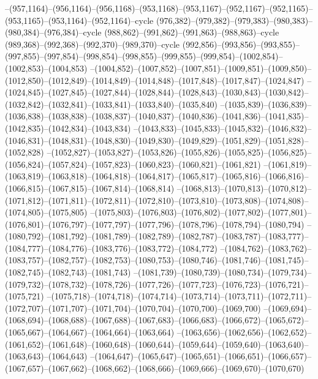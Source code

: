 --(957,1164)--(956,1164)--(956,1168)--(953,1168)--(953,1167)--(952,1167)--(952,1165)--(953,1165)--(953,1164)--(952,1164)--cycle
(976,382)--(979,382)--(979,383)--(980,383)--(980,384)--(976,384)--cycle
(988,862)--(991,862)--(991,863)--(988,863)--cycle
(989,368)--(992,368)--(992,370)--(989,370)--cycle
(992,856)--(993,856)--(993,855)--(997,855)--(997,854)--(998,854)--(998,855)--(999,855)--(999,854)--(1002,854)--(1002,853)--(1004,853)
--(1004,852)--(1007,852)--(1007,851)--(1009,851)--(1009,850)--(1012,850)--(1012,849)--(1014,849)--(1014,848)--(1017,848)--(1017,847)--(1024,847)
--(1024,845)--(1027,845)--(1027,844)--(1028,844)--(1028,843)--(1030,843)--(1030,842)--(1032,842)--(1032,841)--(1033,841)--(1033,840)--(1035,840)
--(1035,839)--(1036,839)--(1036,838)--(1038,838)--(1038,837)--(1040,837)--(1040,836)--(1041,836)--(1041,835)--(1042,835)--(1042,834)--(1043,834)
--(1043,833)--(1045,833)--(1045,832)--(1046,832)--(1046,831)--(1048,831)--(1048,830)--(1049,830)--(1049,829)--(1051,829)--(1051,828)--(1052,828)
--(1052,827)--(1053,827)--(1053,826)--(1055,826)--(1055,825)--(1056,825)--(1056,824)--(1057,824)--(1057,823)--(1060,823)--(1060,821)--(1061,821)
--(1061,819)--(1063,819)--(1063,818)--(1064,818)--(1064,817)--(1065,817)--(1065,816)--(1066,816)--(1066,815)--(1067,815)--(1067,814)--(1068,814)
--(1068,813)--(1070,813)--(1070,812)--(1071,812)--(1071,811)--(1072,811)--(1072,810)--(1073,810)--(1073,808)--(1074,808)--(1074,805)--(1075,805)
--(1075,803)--(1076,803)--(1076,802)--(1077,802)--(1077,801)--(1076,801)--(1076,797)--(1077,797)--(1077,796)--(1078,796)--(1078,794)--(1080,794)
--(1080,792)--(1081,792)--(1081,789)--(1082,789)--(1082,787)--(1083,787)--(1083,777)--(1084,777)--(1084,776)--(1083,776)--(1083,772)--(1084,772)
--(1084,762)--(1083,762)--(1083,757)--(1082,757)--(1082,753)--(1080,753)--(1080,746)--(1081,746)--(1081,745)--(1082,745)--(1082,743)--(1081,743)
--(1081,739)--(1080,739)--(1080,734)--(1079,734)--(1079,732)--(1078,732)--(1078,726)--(1077,726)--(1077,723)--(1076,723)--(1076,721)--(1075,721)
--(1075,718)--(1074,718)--(1074,714)--(1073,714)--(1073,711)--(1072,711)--(1072,707)--(1071,707)--(1071,704)--(1070,704)--(1070,700)--(1069,700)
--(1069,694)--(1068,694)--(1068,688)--(1067,688)--(1067,683)--(1066,683)--(1066,672)--(1065,672)--(1065,667)--(1064,667)--(1064,664)--(1063,664)
--(1063,656)--(1062,656)--(1062,652)--(1061,652)--(1061,648)--(1060,648)--(1060,644)--(1059,644)--(1059,640)--(1063,640)--(1063,643)--(1064,643)
--(1064,647)--(1065,647)--(1065,651)--(1066,651)--(1066,657)--(1067,657)--(1067,662)--(1068,662)--(1068,666)--(1069,666)--(1069,670)--(1070,670)
